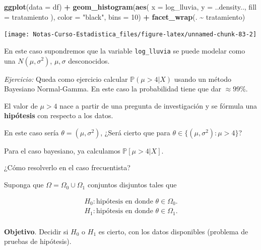 \documentclass[
  12pt,
]{book}
\newenvironment{Shaded}{\begin{snugshade}}{\end{snugshade}}
\newcommand{\DataTypeTok}[1]{\textcolor[rgb]{0.13,0.29,0.53}{#1}}
\newcommand{\DecValTok}[1]{\textcolor[rgb]{0.00,0.00,0.81}{#1}}
\newcommand{\KeywordTok}[1]{\textcolor[rgb]{0.13,0.29,0.53}{\textbf{#1}}}
\newcommand{\NormalTok}[1]{#1}
\newcommand{\OperatorTok}[1]{\textcolor[rgb]{0.81,0.36,0.00}{\textbf{#1}}}
\newcommand{\StringTok}[1]{\textcolor[rgb]{0.31,0.60,0.02}{#1}}
\begin{document}
\begin{Shaded}
\begin{Highlighting}[]
\KeywordTok{ggplot}\NormalTok{(}\DataTypeTok{data =}\NormalTok{ df) }\OperatorTok{+}
\StringTok{  }\KeywordTok{geom\_histogram}\NormalTok{(}\KeywordTok{aes}\NormalTok{(}
    \DataTypeTok{x =}\NormalTok{ log\_lluvia,}
    \DataTypeTok{y =}\NormalTok{ ..density..,}
    \DataTypeTok{fill =}\NormalTok{ tratamiento}
\NormalTok{  ), }\DataTypeTok{color =} \StringTok{"black"}\NormalTok{, }\DataTypeTok{bins =} \DecValTok{10}\NormalTok{) }\OperatorTok{+}
\StringTok{  }\KeywordTok{facet\_wrap}\NormalTok{(. }\OperatorTok{\textasciitilde{}}\StringTok{ }\NormalTok{tratamiento)}
\end{Highlighting}
\end{Shaded}

\begin{center}\texttt{[image: Notas-Curso-Estadistica\_files/figure-latex/unnamed-chunk-83-2]} \end{center}

En este caso supondremos que la variable \texttt{log\_lluvia} se puede modelar como una
\(N(\mu,\sigma^2)\), \(\mu,\sigma\) desconocidos.

\emph{Ejercicio:} Queda como ejercicio calcular \(\mathbb P (\mu > 4 \vert X)\)
usando un método Bayesiano Normal-Gamma. En este caso la probabilidad tiene que
dar \(\approx 99\%\).

El valor de \(\mu>4\) nace a partir de una pregunta de investigación y se fórmula
una \textbf{hipótesis} con respecto a los datos.

En este caso sería \(\theta = (\mu,\sigma^2)\), ¿Será cierto que para \(\theta\in\{(\mu,\sigma^2):\mu>4\}\)?

Para el caso bayesiano, ya calculamos \(\mathbb P[\mu>4|X]\).

¿Cómo resolverlo en el caso frecuentista?

Suponga que \(\Omega = \Omega_0 \cup\Omega_1\) conjuntos disjuntos tales que

\begin{align*} 
H_0 : \text{hipótesis en donde }\theta \in \Omega_0.\\ H_1 :
\text{hipótesis en donde }\theta \in \Omega_1.\\ 
\end{align*}

\textbf{Objetivo}. Decidir si \(H_0\) o \(H_1\) es cierto, con los datos disponibles
(problema de pruebas de hipótesis).
\end{document}
